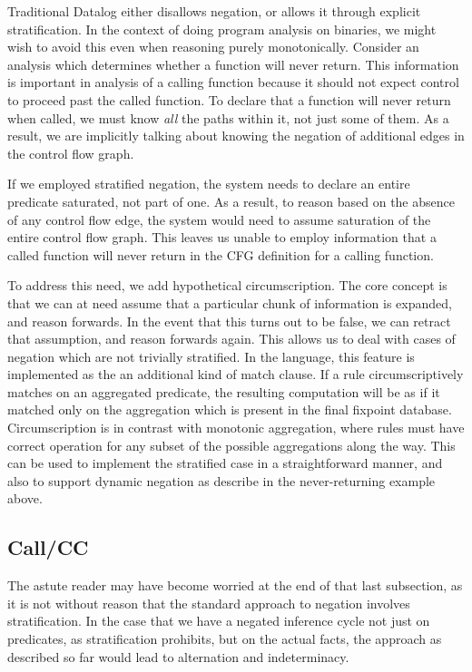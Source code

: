 Traditional Datalog either disallows negation, or allows it through explicit stratification.
In the context of doing program analysis on binaries, we might wish to avoid this even when reasoning purely monotonically.
Consider an analysis which determines whether a function will never return.
This information is important in analysis of a calling function because it should not expect control to proceed past the called function.
To declare that a function will never return when called, we must know \emph{all} the paths within it, not just some of them.
As a result, we are implicitly talking about knowing the negation of additional edges in the control flow graph.

If we employed stratified negation, the system needs to declare an entire predicate saturated, not part of one.
As a result, to reason based on the absence of any control flow edge, the system would need to assume saturation of the entire control flow graph.
This leaves us unable to employ information that a called function will never return in the CFG definition for a calling function.

To address this need, we add hypothetical circumscription.
The core concept is that we can at need assume that a particular chunk of information is expanded, and reason forwards.
In the event that this turns out to be false, we can retract that assumption, and reason forwards again.
This allows us to deal with cases of negation which are not trivially stratified.
In the language, this feature is implemented as the an additional kind of match clause.
If a rule circumscriptively matches on an aggregated predicate, the resulting computation will be as if it matched only on the aggregation which is present in the final fixpoint database.
Circumscription is in contrast with monotonic aggregation, where rules must have correct operation for any subset of the possible aggregations along the way.
This can be used to implement the stratified case in a straightforward manner, and also to support dynamic negation as describe in the never-returning example above.

\subsection{Call/CC}
\label{sec:motive-callcc}
The astute reader may have become worried at the end of that last subsection, as it is not without reason that the standard approach to negation involves stratification.
In the case that we have a negated inference cycle not just on predicates, as stratification prohibits, but on the actual facts, the approach as described so far would lead to alternation and indeterminacy.

